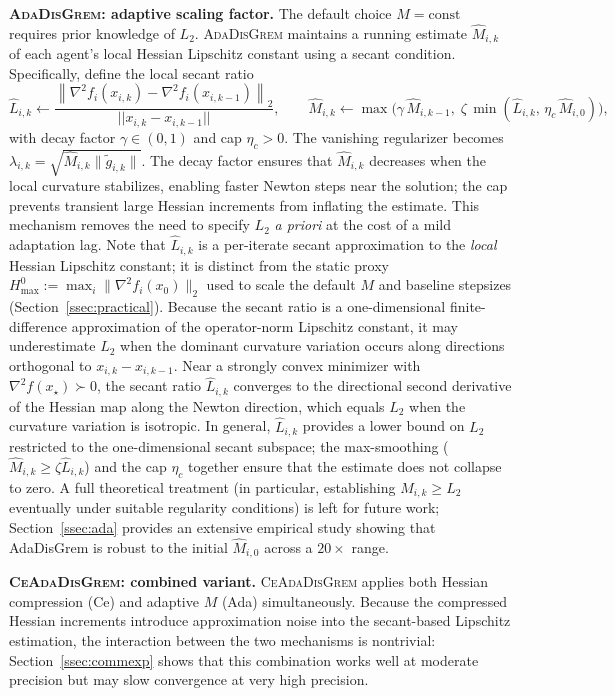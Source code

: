 \documentclass[11pt,a4paper]{article}
\def\norm#1{||#1||}%
\newcommand{\norm}[1]{\left\|#1\right\|}
\newcommand{\normtwo}[1]{\left\|#1\right\|_2}
\begin{document}
	\noindent\textbf{\textsc{AdaDisGrem}: adaptive scaling factor.}
	The default choice $M=\mathrm{const}$ requires prior knowledge of $L_2$.
	\textsc{AdaDisGrem} maintains a running estimate $\hat M_{i,k}$ of
	each agent's local Hessian Lipschitz constant using a secant condition.
	Specifically, define the local secant ratio
	\[
	\hat L_{i,k}\gets
	\frac{\normtwo{\nabla^2 f_i(x_{i,k})-\nabla^2 f_i(x_{i,k-1})}}
	     {\norm{x_{i,k}-x_{i,k-1}}},
	\qquad
	\hat M_{i,k}\gets \max\!\bigl(\gamma\,\hat M_{i,k-1},\;
	\zeta\,\min(\hat L_{i,k},\,\eta_c\,\hat M_{i,0})\bigr),
	\]
	with decay factor $\gamma\in(0,1)$ and cap $\eta_c>0$.
	The vanishing regularizer becomes $\lambda_{i,k}=\sqrt{\hat M_{i,k}\|\tilde g_{i,k}\|}$.
	The decay factor ensures that $\hat M_{i,k}$ decreases when the local curvature
	stabilizes, enabling faster Newton steps near the solution; the cap prevents
	transient large Hessian increments from inflating the estimate.
	This mechanism removes the need to specify $L_2$ \emph{a priori}
	at the cost of a mild adaptation lag.
	Note that $\hat L_{i,k}$ is a per-iterate secant approximation to the
	\emph{local} Hessian Lipschitz constant; it is distinct from the
	static proxy $H_{\max}^0 := \max_i\|\nabla^2 f_i(x_0)\|_2$ used to
	scale the default $M$ and baseline stepsizes (Section~\ref{ssec:practical}).
	Because the secant ratio is a one-dimensional finite-difference
	approximation of the operator-norm Lipschitz constant, it may
	underestimate $L_2$ when the dominant curvature variation occurs
	along directions orthogonal to $x_{i,k}-x_{i,k-1}$.
	Near a strongly convex minimizer with $\nabla^2 f(x_\star)\succ 0$,
	the secant ratio $\hat L_{i,k}$ converges to the directional second
	derivative of the Hessian map along the Newton direction, which
	equals $L_2$ when the curvature variation is isotropic.
	In general, $\hat L_{i,k}$ provides a lower bound on $L_2$
	restricted to the one-dimensional secant subspace; the
	max-smoothing ($\hat M_{i,k}\ge\zeta\hat L_{i,k}$) and the cap
	$\eta_c$ together ensure that the estimate does not collapse to zero.
	A full theoretical treatment (in particular, establishing
	$\hat M_{i,k}\ge L_2$ eventually under suitable regularity
	conditions) is left for future work;
	Section~\ref{ssec:ada} provides an extensive empirical study showing
	that AdaDisGrem is robust to the initial $\hat M_{i,0}$ across a $20\times$ range.
	
	\smallskip
	\noindent\textbf{\textsc{CeAdaDisGrem}: combined variant.}
	\textsc{CeAdaDisGrem} applies both Hessian compression (Ce) and
	adaptive $M$ (Ada) simultaneously.
	Because the compressed Hessian increments introduce approximation noise
	into the secant-based Lipschitz estimation, the interaction between
	the two mechanisms is nontrivial: Section~\ref{ssec:commexp} shows
	that this combination works well at moderate precision but may slow
	convergence at very high precision.
	
\end{document}
